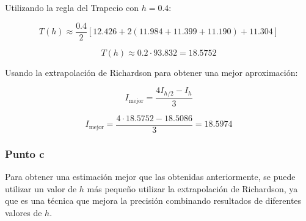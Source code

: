Utilizando la regla del Trapecio con \( h = 0.4 \):

\[
T(h) \approx \frac{0.4}{2} \left[ 12.426 + 2 \left(11.984 + 11.399 + 11.190 \right) + 11.304 \right]
\]

\[
T(h) \approx 0.2 \cdot 93.832 = 18.5752
\]

Usando la extrapolación de Richardson para obtener una mejor aproximación:

$$
I_{\text{mejor}} = \frac{4I_{h/2} - I_{h}}{3}
$$

\[
I_{\text{mejor}} = \frac{4 \cdot 18.5752 -  18.5086}{3} = 18.5974
\]

\subsubsection{Punto c}
Para obtener una estimación mejor que las obtenidas anteriormente, se puede utilizar un valor de \( h \) más pequeño utilizar la extrapolación de Richardson, ya que es una técnica que mejora la precisión combinando resultados de diferentes valores de \( h \).
